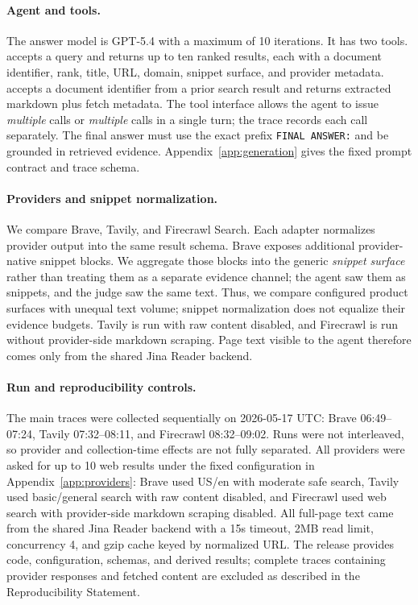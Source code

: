 \paragraph{Agent and tools.}
The answer model is GPT-5.4 with a maximum of 10 iterations. It has two tools. \searchWeb{} accepts a query and returns up to ten ranked results, each with a document identifier, rank, title, URL, domain, snippet surface, and provider metadata. \fetchPage{} accepts a document identifier from a prior search result and returns extracted markdown plus fetch metadata. The tool interface allows the agent to issue \emph{multiple} \searchWeb{} calls or \emph{multiple} \fetchPage{} calls in a single turn; the trace records each call separately. The final answer must use the exact prefix \texttt{FINAL ANSWER:} and be grounded in retrieved evidence. Appendix~\ref{app:generation} gives the fixed prompt contract and trace schema.

\paragraph{Providers and snippet normalization.}
We compare Brave, Tavily, and Firecrawl Search. Each adapter normalizes provider output into the same result schema. Brave exposes additional provider-native snippet blocks. We aggregate those blocks into the generic \emph{snippet surface} rather than treating them as a separate evidence channel; the agent saw them as snippets, and the judge saw the same text. Thus, we compare configured product surfaces with unequal text volume; snippet normalization does not equalize their evidence budgets. Tavily is run with raw content disabled, and Firecrawl is run without provider-side markdown scraping. Page text visible to the agent therefore comes only from the shared Jina Reader backend.

\paragraph{Run and reproducibility controls.}
The main traces were collected sequentially on 2026-05-17 UTC: Brave 06:49--07:24, Tavily 07:32--08:11, and Firecrawl 08:32--09:02. Runs were not interleaved, so provider and collection-time effects are not fully separated. All providers were asked for up to 10 web results under the fixed configuration in Appendix~\ref{app:providers}: Brave used US/en with moderate safe search, Tavily used basic/general search with raw content disabled, and Firecrawl used web search with provider-side markdown scraping disabled. All full-page text came from the shared Jina Reader \fetchPage{} backend with a 15s timeout, 2MB read limit, concurrency 4, and gzip cache keyed by normalized URL. The release provides code, configuration, schemas, and derived results; complete traces containing provider responses and fetched content are excluded as described in the Reproducibility Statement.

